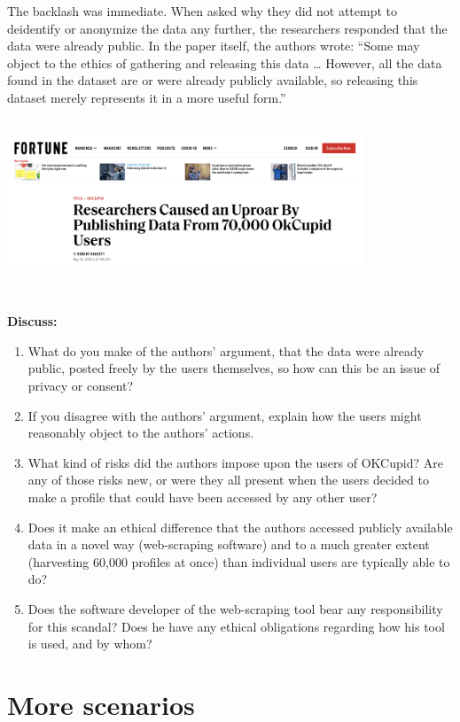 \documentclass[]{book}
\begin{document}
The backlash was immediate. When asked why they did not attempt to deidentify or anonymize the data any further, the researchers responded that the data were already public. In the paper itself, the authors wrote: ``Some may object to the ethics of gathering and releasing this data \ldots{} However, all the data found in the dataset are or were already publicly available, so releasing this dataset merely represents it in a more useful form.''

~\\

\includegraphics[width=0.8\textwidth,height=\textheight]{img/ethics-okcupid.png}

~

\textbf{Discuss:}

\begin{enumerate}
\def\labelenumi{\arabic{enumi}.}
\item
  What do you make of the authors' argument, that the data were already public, posted freely by the users themselves, so how can this be an issue of privacy or consent?
\item
  If you disagree with the authors' argument, explain how the users might reasonably object to the authors' actions.
\item
  What kind of risks did the authors impose upon the users of OKCupid? Are any of those risks new, or were they all present when the users decided to make a profile that could have been accessed by any other user?
\item
  Does it make an ethical difference that the authors accessed publicly available data in a novel way (web-scraping software) and to a much greater extent (harvesting 60,000 profiles at once) than individual users are typically able to do?
\item
  Does the software developer of the web-scraping tool bear any responsibility for this scandal? Does he have any ethical obligations regarding how his tool is used, and by whom?
\end{enumerate}

\hypertarget{more-scenarios}{%
\section*{More scenarios}\label{more-scenarios}}
\end{document}
